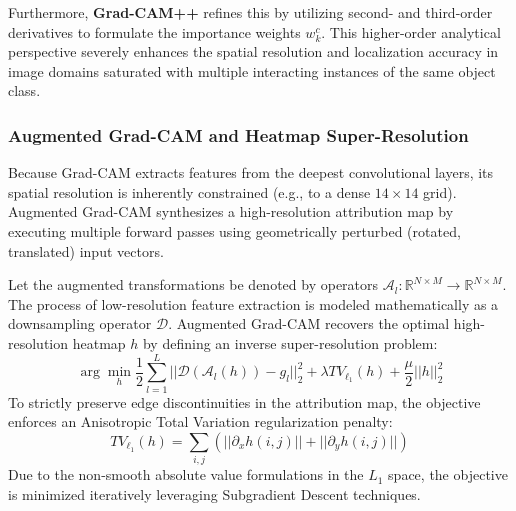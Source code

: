 Furthermore, \textbf{Grad-CAM++} refines this by utilizing second- and third-order derivatives to formulate the importance weights $w_k^c$. This higher-order analytical perspective severely enhances the spatial resolution and localization accuracy in image domains saturated with multiple interacting instances of the same object class.

\subsubsection{Augmented Grad-CAM and Heatmap Super-Resolution}
Because Grad-CAM extracts features from the deepest convolutional layers, its spatial resolution is inherently constrained (e.g., to a dense $14 \times 14$ grid). Augmented Grad-CAM synthesizes a high-resolution attribution map by executing multiple forward passes using geometrically perturbed (rotated, translated) input vectors.

Let the augmented transformations be denoted by operators $\mathcal{A}_l: \mathbb{R}^{N \times M} \to \mathbb{R}^{N \times M}$. The process of low-resolution feature extraction is modeled mathematically as a downsampling operator $\mathcal{D}$. Augmented Grad-CAM recovers the optimal high-resolution heatmap $h$ by defining an inverse super-resolution problem:
\begin{equation}
\arg\min_h \frac{1}{2} \sum_{l=1}^L ||\mathcal{D}(\mathcal{A}_l(h)) - g_l||_2^2 + \lambda TV_{\ell_1}(h) + \frac{\mu}{2} ||h||_2^2
\end{equation}
To strictly preserve edge discontinuities in the attribution map, the objective enforces an Anisotropic Total Variation regularization penalty:
\begin{equation}
TV_{\ell_1}(h) = \sum_{i,j} \left( ||\partial_x h(i,j)|| + ||\partial_y h(i,j)|| \right)
\end{equation}
Due to the non-smooth absolute value formulations in the $L_1$ space, the objective is minimized iteratively leveraging Subgradient Descent techniques.

